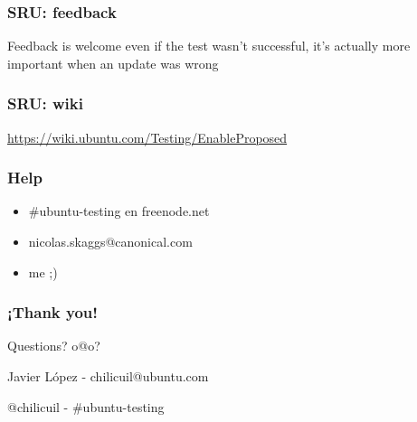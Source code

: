 \documentclass[dvipsnames]{beamer}
\begin{document}
\begin{frame}
  \frametitle{SRU: feedback}
  \begin{center}
  \end{center}
  \begin{center}
      Feedback is welcome even if the test wasn't successful, it's actually more important when an update was wrong
  \end{center}
\end{frame}

\begin{frame}
  \frametitle{SRU: wiki}
  \begin{center}
  \end{center}
  \begin{center}
      \url{https://wiki.ubuntu.com/Testing/EnableProposed}
  \end{center}
\end{frame}

\begin{frame}
  \frametitle {Help}
  \begin{itemize}
  \item \#ubuntu-testing en freenode.net
  \item nicolas.skaggs@canonical.com
  \item me ;)
  \end{itemize}
\end{frame}

\begin{frame}
  \frametitle {¡Thank you!}
  \begin{center}
      {\huge Questions? o@o?}
  \end{center}
  \begin{center}
      {Javier López - chilicuil@ubuntu.com}
  \end{center}
  \begin{center}
      {@chilicuil - \#ubuntu-testing}
  \end{center}
\end{frame}
\end{document}
